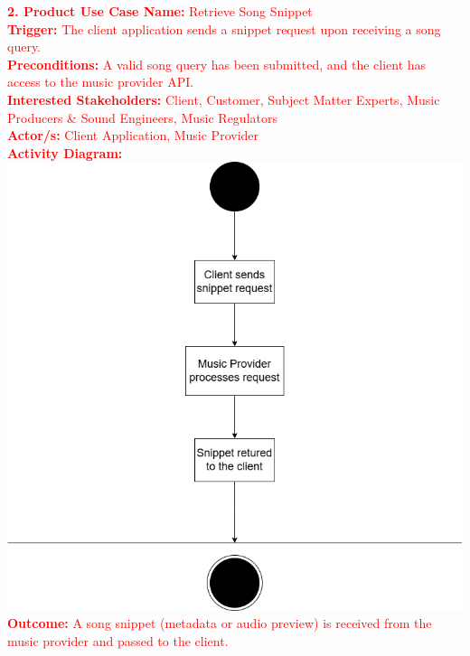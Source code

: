 \documentclass[12pt]{article}
\begin{document}
\noindent\textcolor{red}{\textbf{2. Product Use Case Name:} Retrieve Song Snippet} \\
\textcolor{red}{\textbf{Trigger:} The client application sends a snippet request upon receiving a song query.} \\
\textcolor{red}{\textbf{Preconditions:} A valid song query has been submitted, and the client has access to the music provider API.} \\
\textcolor{red}{\textbf{Interested Stakeholders:} Client, Customer, Subject Matter Experts, Music Producers \& Sound Engineers, Music Regulators} \\
\textcolor{red}{\textbf{Actor/s:} Client Application, Music Provider} \\
\textcolor{red}{\textbf{Activity Diagram:}} \\
\includegraphics[width=\textwidth]{PUC2.drawio.png}
\textcolor{red}{\textbf{Outcome:} A song snippet (metadata or audio preview) is received from the music provider and passed to the client.} \\

\vspace{1cm}
\end{document}
